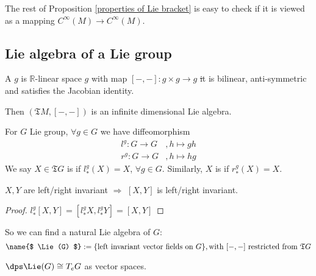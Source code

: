 The rest of Proposition \ref{properties of Lie bracket} is easy to check if it is viewed as a mapping  $ C^\infty(M)\rightarrow C^\infty(M) $.

\subsection{Lie algebra of a Lie group}
\begin{definition}
    A  $ g $ is  $ \mathbb{R} $-linear space  $ g $ with map   $ [-,-]:g\times g\rightarrow g $ \st it is bilinear, anti-symmetric and satisfies the Jacobian identity.
    
    Then  $ (\mathfrak{T}M,[-,-]) $ is an infinite dimensional Lie algebra.
\end{definition}
For  $ G $ Lie group,  $ \forall g\in G $ we have diffeomorphism  
\begin{align*}
    l^g:G\rightarrow G&,h\mapsto gh\\
    r^g:G\rightarrow G&,h\mapsto hg   
\end{align*}
We say  $ X\in \mathfrak{T}G $ is  if  $ l_*^g(X)=X $,  $ \forall g\in G $. Similarly,  $ X $ is  if  $ r_*^g(X)=X $.   
\begin{proposition}
     $ X,Y $ are left/right invariant  $ \Rightarrow  $  $ [X,Y] $ is left/right invariant.  
\end{proposition}
\begin{proof}
     $ l_*^g[X,Y]=[l_*^gX,l_*^gY]=[X,Y] $ 
\end{proof}
So we can find a natural Lie algebra of  $ G $:
\[\name{$ \Lie(G) $}:=\{\text{left invariant vector fields on  $ G $}\},\text{with  $ [-,-] $ restricted from  $ \mathfrak{T}G $}\]
\begin{corollary}
     $ \dps \Lie(G)\cong T_eG $ as vector spaces. 
\end{corollary}
